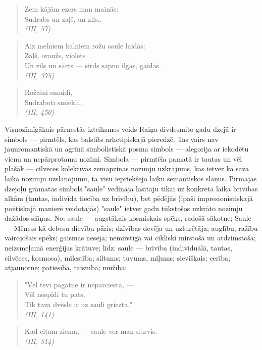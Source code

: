 \documentclass[11pt]{article}
\begin{document}
\begin{quote}
Zem kājām ezers man mainās:\\
Sudrabs un zaļš, un zils..\\
{\em (III, 57)}
\end{quote}

\begin{quote}
Aiz melniem kalniem rožu saule laidās:\\
Zaļš, oranžs, violets\\
Un zils un sārts --- sirds sapņo ilgās, gaidās.\\
{\em (III, 375)}
\end{quote}

\begin{quote}
Rožaini smaidi,\\
Sudraboti smiekļi..\\
{\em (III, 450)}
\end{quote}

Visnozīmīgākais pārnestās izteiksmes veids Raiņa
divdesmito gadu dzejā ir simbols --- pirmtēls, kas
balstīts arhetipiskajā pieredzē. Tas vairs nav
jaunromantiskā un agrīnā simbolistiskā posma simbols ---
alegorija ar iekodētu vienu un nepārprotamu nozīmi.
Simbola --- pirmtēla pamatā ir tautas un vēl plašāk ---
cilvēces kolektīvās zemapziņas nozīmju uzkrājums, kas ietver
kā sava laika nozīmju uzslāņojumu, tā visu iepriekšējo laiku
semantiskos slāņus. Pirmajās dzejoļu grāmatās simbols
"saule" vedināja lasītāju tikai uz konkrētā laika
brīvības alkām (tautas, indivīda tiecība uz brīvību),
bet pēdējās (īpaši impresionistiskajā poētiskajā manierē
veidotajās) "saule" ietver gadu tūkstošos uzkrāto nozīmju
dažādos slāņus. No: saule --- augstākais kosmiskais spēks,
radošā sākotne; Saule --- Mēness kā debesu dievību pāris;
dzīvības devēja un uzturētāja; auglību, ražību vairojošais
spēks; gaismas nesēja; nemirstīgā vai cikliski mirstošā
un atdzimstošā; neizsmeļamā enerģijas krātuve; līdz:
saule --- brīvība (individuālā, tautas, cilvēces,
kosmosa), mīlestība; siltums; tuvums, mīļums;
sievišķais; cerība; atjaunotne; patiesība, taisnība;
mūžība:

\begin{quote}
"Vēl tevī pagātne ir nepārciesta, ---\\
Vēl nespīdi tu pats,\\
Tik tava dvēsle ir uz sauli griezta."\\
{\em (III, 141)}
\end{quote}

\begin{quote}
Kad citam ziema, --- saule ver man durvis.\\
{\em (III, 314)}
\end{quote}
\end{document}
